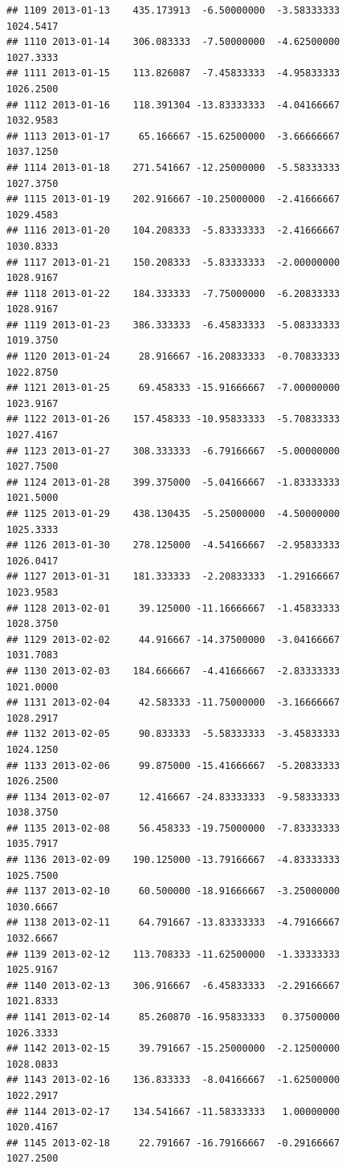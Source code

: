 \documentclass[
]{article}
\begin{document}
\begin{verbatim}
## 1109 2013-01-13    435.173913  -6.50000000  -3.58333333    1024.5417
## 1110 2013-01-14    306.083333  -7.50000000  -4.62500000    1027.3333
## 1111 2013-01-15    113.826087  -7.45833333  -4.95833333    1026.2500
## 1112 2013-01-16    118.391304 -13.83333333  -4.04166667    1032.9583
## 1113 2013-01-17     65.166667 -15.62500000  -3.66666667    1037.1250
## 1114 2013-01-18    271.541667 -12.25000000  -5.58333333    1027.3750
## 1115 2013-01-19    202.916667 -10.25000000  -2.41666667    1029.4583
## 1116 2013-01-20    104.208333  -5.83333333  -2.41666667    1030.8333
## 1117 2013-01-21    150.208333  -5.83333333  -2.00000000    1028.9167
## 1118 2013-01-22    184.333333  -7.75000000  -6.20833333    1028.9167
## 1119 2013-01-23    386.333333  -6.45833333  -5.08333333    1019.3750
## 1120 2013-01-24     28.916667 -16.20833333  -0.70833333    1022.8750
## 1121 2013-01-25     69.458333 -15.91666667  -7.00000000    1023.9167
## 1122 2013-01-26    157.458333 -10.95833333  -5.70833333    1027.4167
## 1123 2013-01-27    308.333333  -6.79166667  -5.00000000    1027.7500
## 1124 2013-01-28    399.375000  -5.04166667  -1.83333333    1021.5000
## 1125 2013-01-29    438.130435  -5.25000000  -4.50000000    1025.3333
## 1126 2013-01-30    278.125000  -4.54166667  -2.95833333    1026.0417
## 1127 2013-01-31    181.333333  -2.20833333  -1.29166667    1023.9583
## 1128 2013-02-01     39.125000 -11.16666667  -1.45833333    1028.3750
## 1129 2013-02-02     44.916667 -14.37500000  -3.04166667    1031.7083
## 1130 2013-02-03    184.666667  -4.41666667  -2.83333333    1021.0000
## 1131 2013-02-04     42.583333 -11.75000000  -3.16666667    1028.2917
## 1132 2013-02-05     90.833333  -5.58333333  -3.45833333    1024.1250
## 1133 2013-02-06     99.875000 -15.41666667  -5.20833333    1026.2500
## 1134 2013-02-07     12.416667 -24.83333333  -9.58333333    1038.3750
## 1135 2013-02-08     56.458333 -19.75000000  -7.83333333    1035.7917
## 1136 2013-02-09    190.125000 -13.79166667  -4.83333333    1025.7500
## 1137 2013-02-10     60.500000 -18.91666667  -3.25000000    1030.6667
## 1138 2013-02-11     64.791667 -13.83333333  -4.79166667    1032.6667
## 1139 2013-02-12    113.708333 -11.62500000  -1.33333333    1025.9167
## 1140 2013-02-13    306.916667  -6.45833333  -2.29166667    1021.8333
## 1141 2013-02-14     85.260870 -16.95833333   0.37500000    1026.3333
## 1142 2013-02-15     39.791667 -15.25000000  -2.12500000    1028.0833
## 1143 2013-02-16    136.833333  -8.04166667  -1.62500000    1022.2917
## 1144 2013-02-17    134.541667 -11.58333333   1.00000000    1020.4167
## 1145 2013-02-18     22.791667 -16.79166667  -0.29166667    1027.2500

\end{verbatim}
\end{document}
